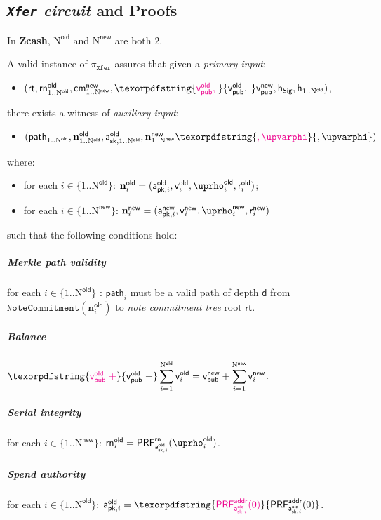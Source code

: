 \documentclass{article}
\newcommand{\changedcolor}{magenta}
\newcommand{\setchanged}{\color{\changedcolor}}
\newcommand{\changed}[1]{\texorpdfstring{{\setchanged{#1}}}{#1}}
\newcommand{\term}[1]{\textsl{#1}\xspace}
\newcommand{\termbf}[1]{\textbf{#1}\xspace}
\newcommand{\Zcash}{\termbf{Zcash}}
\newcommand{\coinCommitmentTree}{\term{note commitment tree}}
\newcommand{\setof}[1]{\{{#1}\}}
\newcommand{\AuthPublicOld}[1]{\mathsf{a^{old}_{pk,\mathnormal{#1}}}}
\newcommand{\AuthPrivateOld}[1]{\mathsf{a^{old}_{sk,\mathnormal{#1}}}}
\newcommand{\AuthPublicNew}[1]{\mathsf{a^{new}_{pk,\mathnormal{#1}}}}
\newcommand{\CoinCommitRandOld}[1]{\mathsf{r^{old}_\mathnormal{#1}}}
\newcommand{\CoinCommitRandNew}[1]{\mathsf{r^{new}_\mathnormal{#1}}}
\newcommand{\CoinAddressRandOld}[1]{\mathsf{\uprho^{old}_\mathnormal{#1}}}
\newcommand{\CoinAddressRandNew}[1]{\mathsf{\uprho^{new}_\mathnormal{#1}}}
\newcommand{\CoinAddressPreRand}{\mathsf{\upvarphi}}
\newcommand{\PRF}[2]{\mathsf{{PRF}^{#2}_\mathnormal{#1}}}
\newcommand{\PRFaddr}[1]{\PRF{#1}{addr}}
\newcommand{\PRFsn}[1]{\PRF{#1}{rn}}
\newcommand{\cmNew}[1]{\mathsf{{cm}^{new}_\mathnormal{#1}}}
\newcommand{\MerkleDepth}{\mathsf{d}}
\newcommand{\snOld}[1]{\mathsf{{rn}^{old}_\mathnormal{#1}}}
\newcommand{\vsum}[2]{\smashoperator[r]{\sum_{#1}^{#2}}}
\newcommand{\rt}{\mathsf{rt}}
\newcommand{\hSig}{\mathsf{h_{Sig}}}
\newcommand{\h}[1]{\mathsf{h_{\mathnormal{#1}}}}
\newcommand{\NOld}{\mathrm{N}^\mathsf{old}}
\newcommand{\NNew}{\mathrm{N}^\mathsf{new}}
\newcommand{\allN}[1]{\mathrm{1}..\mathrm{N}^\mathsf{#1}}
\newcommand{\allOld}{\allN{old}}
\newcommand{\allNew}{\allN{new}}
\newcommand{\setofOld}{\setof{\allOld}}
\newcommand{\setofNew}{\setof{\allNew}}
\newcommand{\PourCircuit}{\term{\texttt{Xfer} circuit}}
\newcommand{\PourStatement}{\texttt{Xfer}}
\newcommand{\PourProof}{\pi_{\PourStatement}}
\newcommand{\vpubOld}{\mathsf{v_{pub}^{old}}}
\newcommand{\vpubNew}{\mathsf{v_{pub}^{new}}}
\newcommand{\cOld}[1]{\mathbf{n}_{#1}^\mathsf{old}}
\newcommand{\cNew}[1]{\mathbf{n}_{#1}^\mathsf{new}}
\newcommand{\vOld}[1]{\mathsf{v}_{#1}^\mathsf{old}}
\newcommand{\vNew}[1]{\mathsf{v}_{#1}^\mathsf{new}}
\newcommand{\treepath}[1]{\mathsf{path}_{#1}}
\newcommand{\Commitment}{\mathtt{NoteCommitment}}
\begin{document}
\subsection{\PourCircuit and Proofs}

In \Zcash, $\NOld$ and $\NNew$ are both $2$.

A valid instance of $\PourProof$ assures that given a \term{primary input}:

\begin{itemize}
  \item[] $(\rt, \snOld{\allOld}, \cmNew{\allNew}, \changed{\vpubOld,\;}
\vpubNew, \hSig, \h{\allOld})$,
\end{itemize}

there exists a witness of \term{auxiliary input}:

\begin{itemize}
  \item[] $(\treepath{\allOld}, \cOld{\allOld}, \AuthPrivateOld{\allOld},
\cNew{\allNew}\changed{, \CoinAddressPreRand})$
\end{itemize}

where:

\begin{itemize}
  \item[] for each $i \in \setofOld$: $\cOld{i} = (\AuthPublicOld{i},
\vOld{i}, \CoinAddressRandOld{i}, \CoinCommitRandOld{i})$;
  \item[] for each $i \in \setofNew$: $\cNew{i} = (\AuthPublicNew{i},
\vNew{i}, \CoinAddressRandNew{i}, \CoinCommitRandNew{i})$
\end{itemize}

such that the following conditions hold:

\subparagraph{Merkle path validity}

for each $i \in \setofOld$ \changed{$\mid$ $\vOld{i} \neq 0$}:
$\treepath{i}$ must be a valid path of depth $\MerkleDepth$ from \linebreak
$\Commitment(\cOld{i})$ to \coinCommitmentTree root $\rt$.

\subparagraph{Balance}

$\changed{\vpubOld\; +} \vsum{i=1}{\NOld} \vOld{i} = \vpubNew + \vsum{i=1}{\NNew} \vNew{i}$.

\subparagraph{Serial integrity}

for each $i \in \setofNew$:
$\snOld{i} = \PRFsn{\AuthPrivateOld{i}}(\CoinAddressRandOld{i})$.

\subparagraph{Spend authority}

for each $i \in \setofOld$:
$\AuthPublicOld{i} = \changed{\PRFaddr{\AuthPrivateOld{i}}(0)}$.
\end{document}
